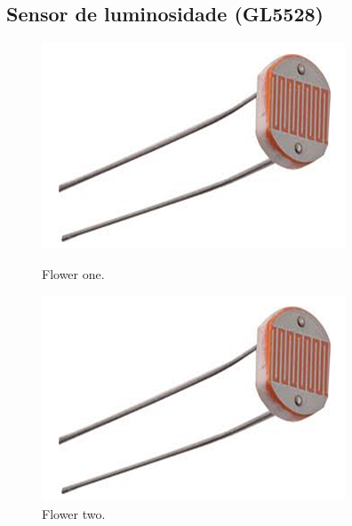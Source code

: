 \newpage

\subsection{Sensor de luminosidade (GL5528)}

\begin{figure}[!tbp]
	\centering
	\begin{minipage}[b]{0.4\textwidth}
		\includegraphics[width=\textwidth]{img/hardware/luminosidade.png}
		\caption{Flower one.}
	\end{minipage}
	\hfill
	\begin{minipage}[b]{0.4\textwidth}
		\includegraphics[width=\textwidth]{img/hardware/luminosidade.png}
		\caption{Flower two.}
	\end{minipage}
\end{figure}



